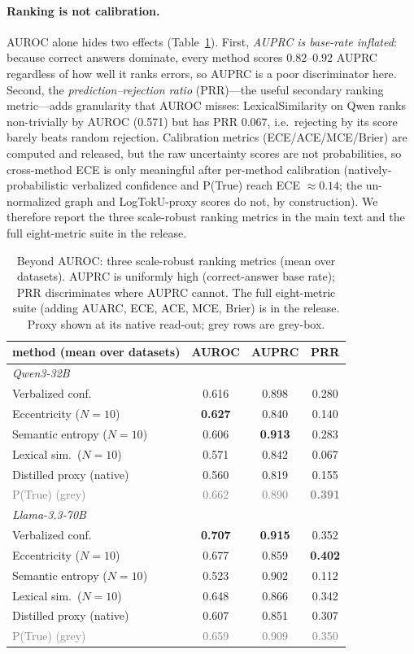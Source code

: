 \documentclass[11pt]{article}
\newcommand{\best}[1]{\textbf{#1}}
\newcommand{\grey}[1]{\textcolor{gray}{#1}}
\begin{document}
\paragraph{Ranking is not calibration.} AUROC alone hides two effects
(Table~\ref{tab:metrics}). First, \emph{AUPRC is base-rate inflated}: because correct
answers dominate, every method scores $0.82$--$0.92$ AUPRC regardless of how well it
ranks errors, so AUPRC is a poor discriminator here. Second, the
\emph{prediction--rejection ratio} (PRR)---the useful secondary ranking metric---adds
granularity that AUROC misses: LexicalSimilarity on Qwen ranks non-trivially by AUROC
(0.571) but has PRR $0.067$, i.e.\ rejecting by its score barely beats random rejection.
Calibration metrics (ECE/ACE/MCE/Brier) are computed and released, but the raw
uncertainty scores are not probabilities, so cross-method ECE is only meaningful after
per-method calibration (natively-probabilistic verbalized confidence and P(True) reach
ECE $\approx 0.14$; the un-normalized graph and LogTokU-proxy scores do not, by construction).
We therefore report the three scale-robust ranking metrics in the main text and the full
eight-metric suite in the release.

\begin{table}[t]\centering\small
\setlength{\tabcolsep}{4pt}
\begin{tabular}{l ccc}
\toprule
method (mean over datasets) & AUROC & AUPRC & PRR\\
\midrule
\multicolumn{4}{l}{\emph{Qwen3-32B}}\\
Verbalized conf.        & 0.616 & 0.898 & 0.280\\
Eccentricity ($N{=}10$) & \best{0.627} & 0.840 & 0.140\\
Semantic entropy ($N{=}10$) & 0.606 & \best{0.913} & 0.283\\
Lexical sim.\ ($N{=}10$)& 0.571 & 0.842 & 0.067\\
Distilled proxy (native)& 0.560 & 0.819 & 0.155\\
\grey{P(True) (grey)}   & \grey{0.662} & \grey{0.890} & \grey{\best{0.391}}\\
\midrule
\multicolumn{4}{l}{\emph{Llama-3.3-70B}}\\
Verbalized conf.        & \best{0.707} & \best{0.915} & 0.352\\
Eccentricity ($N{=}10$) & 0.677 & 0.859 & \best{0.402}\\
Semantic entropy ($N{=}10$) & 0.523 & 0.902 & 0.112\\
Lexical sim.\ ($N{=}10$)& 0.648 & 0.866 & 0.342\\
Distilled proxy (native)& 0.607 & 0.851 & 0.307\\
\grey{P(True) (grey)}   & \grey{0.659} & \grey{0.909} & \grey{0.350}\\
\bottomrule
\end{tabular}
\caption{Beyond AUROC: three scale-robust ranking metrics (mean over datasets). AUPRC is
uniformly high (correct-answer base rate); PRR discriminates where AUPRC cannot. The full
eight-metric suite (adding AUARC, ECE, ACE, MCE, Brier) is in the release. Proxy shown at
its native read-out; grey rows are grey-box.}
\label{tab:metrics}
\end{table}
\end{document}
